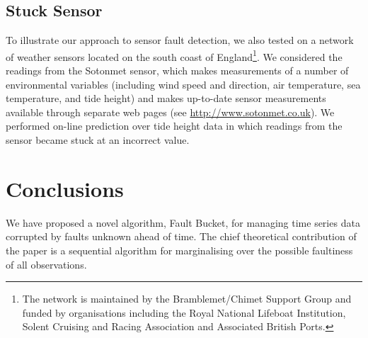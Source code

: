 \documentclass{article}
\begin{document}
\subsection{Stuck Sensor}
To illustrate our approach to sensor fault detection, we also tested on a network of weather sensors located on the south coast of England\footnote{The network is maintained by the Bramblemet/Chimet Support Group and funded by organisations including the Royal National Lifeboat Institution, Solent Cruising and Racing Association and Associated British Ports.}. We considered the readings from the Sotonmet sensor, which makes measurements of a number of environmental variables (including wind speed and direction, air temperature, sea temperature, and tide height) and makes up-to-date sensor measurements available through separate web pages (see \url{http://www.sotonmet.co.uk}). We performed on-line prediction over tide height data in which readings from the sensor became stuck at an incorrect value. 

\section{Conclusions}
We have proposed a novel algorithm, Fault Bucket, for managing time series data corrupted by faults unknown ahead of time. The chief theoretical contribution of the paper is a sequential algorithm for marginalising over the possible faultiness of all observations.



\end{document}
